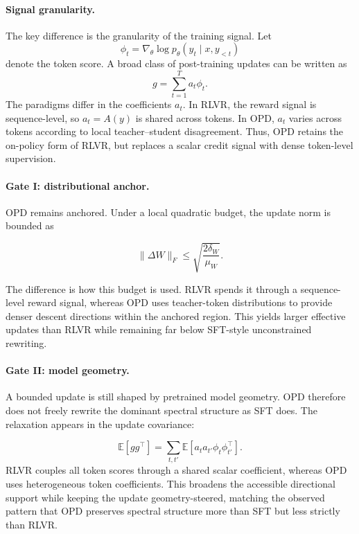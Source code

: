 \paragraph{Signal granularity.}
The key difference is the granularity of the training signal. Let
\[
\phi_t=\nabla_\theta \log p_\theta(y_t\mid x,y_{<t})
\]
denote the token score. A broad class of post-training updates can be written as
\vspace{-1em}
\begin{equation}
g = \sum_{t=1}^{T} a_t \phi_t .
\label{eq:unified_gradient}
\end{equation}
The paradigms differ in the coefficients $a_t$. In RLVR, the reward signal is sequence-level, so $a_t=A(y)$ is shared across tokens. In OPD, $a_t$ varies across tokens according to local teacher--student disagreement. Thus, OPD retains the on-policy form of RLVR, but replaces a scalar credit signal with dense token-level supervision.

\paragraph{Gate I: distributional anchor.}
OPD remains anchored. Under a local quadratic budget, the update norm is
bounded as

\begin{equation}
\|\Delta W\|_F
\leq
\sqrt{\frac{2\delta_W}{\mu_W}} .
\label{eq:opd_gate1_bound}
\end{equation}

The difference is how this budget is used. RLVR spends it through a
sequence-level reward signal, whereas OPD uses teacher-token distributions to provide denser descent directions within the anchored region. This yields larger effective updates than RLVR while remaining far below SFT-style unconstrained rewriting.

\paragraph{Gate II: model geometry.}
A bounded update is still shaped by pretrained model geometry. OPD therefore does not freely rewrite the dominant spectral structure as SFT does. The relaxation appears in the update covariance:

\begin{equation}
\mathbb{E}[gg^\top]
=
\sum_{t,t'}
\mathbb{E}\!\left[
a_t a_{t'} \phi_t \phi_{t'}^\top
\right].
\label{eq:opd_gradient_cov}
\end{equation}
RLVR couples all token scores through a shared scalar coefficient, whereas OPD uses heterogeneous token coefficients. This broadens the accessible directional support while keeping the update geometry-steered, matching the observed pattern that OPD preserves spectral structure more than SFT but less strictly than RLVR.


